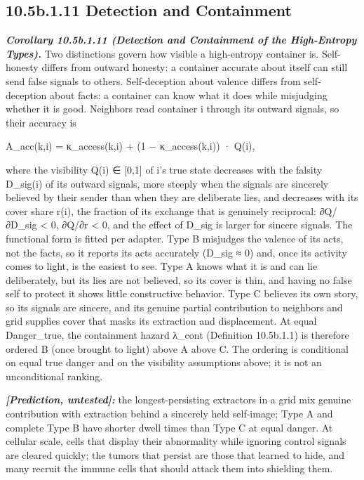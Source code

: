 \documentclass[
]{article}
\begin{document}
\hypertarget{b.1.11-detection-and-containment}{%
\subsection{10.5b.1.11 Detection and
Containment}\label{b.1.11-detection-and-containment}}

\emph{\textbf{Corollary 10.5b.1.11 (Detection and Containment of the
High-Entropy Types).}} Two distinctions govern how visible a
high-entropy container is. Self-honesty differs from outward honesty: a
container accurate about itself can still send false signals to others.
Self-deception about valence differs from self-deception about facts: a
container can know what it does while misjudging whether it is good.
Neighbors read container i through its outward signals, so their
accuracy is

A\_acc(k,i) = κ\_access(k,i) + (1 − κ\_access(k,i)) · Q(i),

where the visibility Q(i) ∈ {[}0,1{]} of i's true state decreases with
the falsity D\_sig(i) of its outward signals, more steeply when the
signals are sincerely believed by their sender than when they are
deliberate lies, and decreases with its cover share r(i), the fraction
of its exchange that is genuinely reciprocal: ∂Q/∂D\_sig \textless{} 0,
∂Q/∂r \textless{} 0, and the effect of D\_sig is larger for sincere
signals. The functional form is fitted per adapter. Type B misjudges the
valence of its acts, not the facts, so it reports its acts accurately
(D\_sig ≈ 0) and, once its activity comes to light, is the easiest to
see. Type A knows what it is and can lie deliberately, but its lies are
not believed, so its cover is thin, and having no false self to protect
it shows little constructive behavior. Type C believes its own story, so
its signals are sincere, and its genuine partial contribution to
neighbors and grid supplies cover that masks its extraction and
displacement. At equal Danger\_true, the containment hazard λ\_cont
(Definition 10.5b.1.1) is therefore ordered B (once brought to light)
above A above C. The ordering is conditional on equal true danger and on
the visibility assumptions above; it is not an unconditional ranking.

\emph{\textbf{{[}Prediction, untested{]}:}} the longest-persisting
extractors in a grid mix genuine contribution with extraction behind a
sincerely held self-image; Type A and complete Type B have shorter dwell
times than Type C at equal danger. At cellular scale, cells that display
their abnormality while ignoring control signals are cleared quickly;
the tumors that persist are those that learned to hide, and many recruit
the immune cells that should attack them into shielding them.
\end{document}
